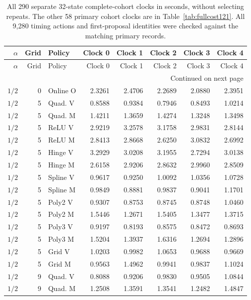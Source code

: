 \begingroup
\small\setlength{\tabcolsep}{3pt}
\begin{longtable}{rrlrrrrr}
\caption{All 290 separate 32-state complete-cohort clocks in seconds, without selecting repeats. The other 58 primary cohort clocks are in Table~\ref{tab:fullcost121}. All 9,280 timing actions and first-proposal identities were checked against the matching primary records.}\label{tab:allclocks121}\\
\toprule
$\alpha$ & Grid & Policy & Clock 0 & Clock 1 & Clock 2 & Clock 3 & Clock 4\\
\midrule\endfirsthead
\toprule
$\alpha$ & Grid & Policy & Clock 0 & Clock 1 & Clock 2 & Clock 3 & Clock 4\\
\midrule\endhead
\midrule\multicolumn{8}{r}{Continued on next page}\\\endfoot
\bottomrule\endlastfoot
$1/2$ & 0 & Online O & 2.3261 & 2.4706 & 2.2689 & 2.0880 & 2.3951\\
$1/2$ & 5 & Quad. V & 0.8588 & 0.9384 & 0.7946 & 0.8493 & 1.0214\\
$1/2$ & 5 & Quad. M & 1.4211 & 1.3659 & 1.4274 & 1.3248 & 1.3498\\
$1/2$ & 5 & ReLU V & 2.9219 & 3.2578 & 3.1758 & 2.9831 & 2.8144\\
$1/2$ & 5 & ReLU M & 2.8413 & 2.8668 & 2.6250 & 3.0832 & 2.6992\\
$1/2$ & 5 & Hinge V & 3.2929 & 3.0208 & 3.1955 & 2.7294 & 3.0138\\
$1/2$ & 5 & Hinge M & 2.6158 & 2.9206 & 2.8632 & 2.9960 & 2.8509\\
$1/2$ & 5 & Spline V & 0.9617 & 0.9250 & 1.0092 & 1.0356 & 1.0728\\
$1/2$ & 5 & Spline M & 0.9849 & 0.8881 & 0.9837 & 0.9041 & 1.1701\\
$1/2$ & 5 & Poly2 V & 0.9307 & 0.8753 & 0.8745 & 0.8748 & 1.0460\\
$1/2$ & 5 & Poly2 M & 1.5446 & 1.2671 & 1.5405 & 1.3477 & 1.3715\\
$1/2$ & 5 & Poly3 V & 0.9197 & 0.8193 & 0.8575 & 0.8472 & 0.8693\\
$1/2$ & 5 & Poly3 M & 1.5204 & 1.3937 & 1.6316 & 1.2694 & 1.2896\\
$1/2$ & 5 & Grid V & 1.0203 & 0.9982 & 1.0653 & 0.9688 & 0.9669\\
$1/2$ & 5 & Grid M & 0.9563 & 1.4962 & 0.9941 & 0.9837 & 1.1024\\
$1/2$ & 9 & Quad. V & 0.8088 & 0.9206 & 0.9830 & 0.9505 & 1.0844\\
$1/2$ & 9 & Quad. M & 1.2508 & 1.3591 & 1.3541 & 1.2482 & 1.4847\\

\end{longtable}
